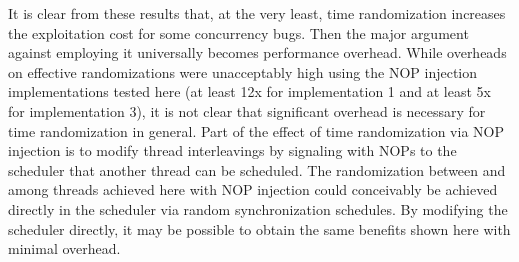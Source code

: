It is clear from these results that, at the very least, time randomization increases the exploitation cost for some concurrency bugs.
Then the major argument against employing it universally becomes performance overhead.
While overheads on effective randomizations were unacceptably high using the NOP injection implementations tested here (at least 12x for implementation 1 and at least 5x for implementation 3), it is not clear that significant overhead is necessary for time randomization in general.
Part of the effect of time randomization via NOP injection is to modify thread interleavings by signaling with NOPs to the scheduler that another thread can be scheduled.
The randomization between and among threads achieved here with NOP injection could conceivably be achieved directly in the scheduler via random synchronization schedules.
By modifying the scheduler directly, it may be possible to obtain the same benefits shown here with minimal overhead.